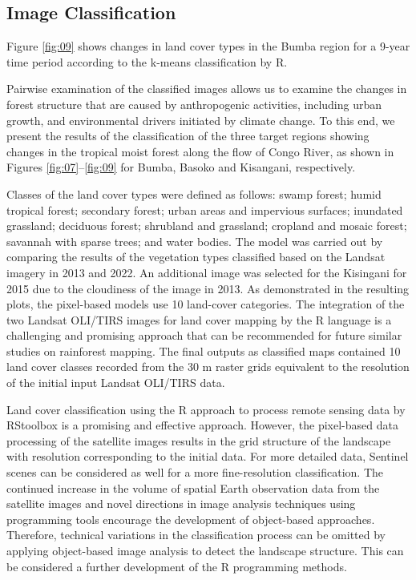 \documentclass[applsci,article,accept,pdftex,moreauthors]{Definitions/mdpi}
\begin{document}
\subsection{Image Classification}

Figure \ref{fig:09} shows changes in land cover types in the Bumba region for a 9-year time period according to the k-means classification by R.



Pairwise examination of the classified images allows us to examine the changes in forest structure that are caused by anthropogenic activities, including urban growth, and environmental drivers initiated by climate change. To this end, we present the results of the classification of the three target regions showing changes in the tropical moist forest along the flow of Congo River, as shown in Figures \ref{fig:07}--\ref{fig:09} for Bumba, Basoko and Kisangani, respectively. 


Classes of the land cover types were defined as follows: swamp forest; humid tropical forest; secondary forest; urban areas and impervious surfaces; inundated grassland; deciduous forest; shrubland and grassland; cropland and mosaic forest; savannah with sparse trees; and water bodies. The model was carried out by comparing the results of the vegetation types classified based on the Landsat imagery in 2013 and 2022. An additional image was selected for the Kisingani for 2015 due to the cloudiness of the image in 2013. As demonstrated in the resulting plots, the pixel-based models use 10 land-cover categories. The integration of the two Landsat OLI/TIRS images for land cover mapping by the R language is a challenging and promising approach that can be recommended for future similar studies on rainforest mapping. The final outputs as classified maps contained 10 land cover classes recorded from the 30 m raster grids equivalent to the resolution of the initial input Landsat OLI/TIRS data. 

Land cover classification using the R approach to process remote sensing data by RStoolbox is a promising and effective approach. However, the pixel-based data processing of the satellite images results in the grid structure of the landscape with resolution corresponding to the initial data. For more detailed data, Sentinel scenes can be considered as well for a more fine-resolution classification. The continued increase in the volume of spatial Earth observation data from the satellite images and novel directions in image analysis techniques using programming tools encourage the development of object-based approaches. Therefore, technical variations in the classification process can be omitted by applying object-based image analysis to detect the landscape structure. This can be considered a further development of the R programming methods.
\end{document}
